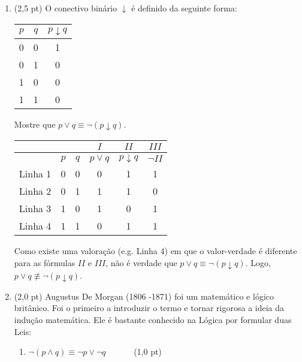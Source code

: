 \documentclass[11pt,a4paper,oneside]{article}
\begin{document}
\begin{enumerate}

	\item (2,5 pt) O conectivo binário $\downarrow$	é definido da seguinte forma:
		\begin{center}
			\begin{tabular}{c|c|c}
			\hline 
			$p$ & $q$ & $p \downarrow q$ \\ 
			\hline 
			0 & 0 & 1 \\ 
			0 & 1 & 0 \\ 
			1 & 0 & 0 \\ 
			1 & 1 & 0 \\ 
			\hline 
			\end{tabular} 
		\end{center}
		
		Mostre que $p \vee q \equiv \neg (p \downarrow q)$.\\
		
		{\color{verde} 
			\begin{center}
				\begin{tabular}{c|cc|c|c|c}
				 &  &  & $I$ & $II$ & $III$\\
				\hline
				 & $p$ & $q$ & $p \vee q$ & $p \downarrow q$ & $\neg II$ \\ 
				\hline 
				Linha 1 & 0 & 0 & 0 & 1 & 1 \\
				Linha 2 & 0 & 1 & 1 & 1 & 0 \\
				Linha 3 & 1 & 0 & 1 & 0 & 1 \\ 
				Linha 4 & 1 & 1 & 0 & 1 & 1 \\ 
				\hline 
				\end{tabular} 
			\end{center}
			
			Como existe uma valoração (e.g. Linha 4) em que o valor-verdade é diferente para as fórmulas $II$ e $III$, não é verdade que $p \vee q \equiv \neg (p \downarrow q)$. Logo, $p \vee q \not\equiv \neg (p \downarrow q)$.
		}
		
	\item (2,0 pt) Augustus De Morgan (1806 -1871) foi um matemático e lógico britânico. Foi o primeiro a introduzir o termo e tornar rigorosa a ideia da indução matemática. Ele é bastante conhecido na Lógica por formular duas Leis: 

	\begin{enumerate}
		\item $\neg(p \wedge q) \equiv \neg p \vee \neg q$ \ \ \ \ \ \ (1,0 pt)\\
		

\end{enumerate}
\end{enumerate}
\end{document}
